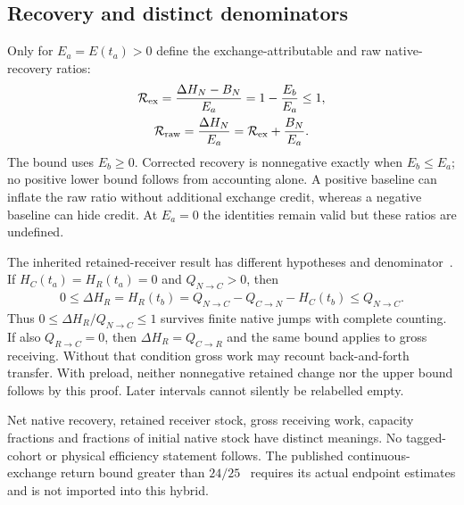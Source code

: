 \subsection{Recovery and distinct denominators}\label{sec:recovery}
Only for $E_a=E(t_a)>0$ define the exchange-attributable and raw native-recovery ratios:
\begin{equation}\label{eq:a16}%
\begin{gathered}
\mathcal R_{\rm ex}=\frac{\Delta H_N-B_N}{E_a}
=1-\frac{E_b}{E_a}\le1,\\ \mathcal R_{\rm raw}=\frac{\Delta H_N}{E_a}
=\mathcal R_{\rm ex}+\frac{B_N}{E_a}.
\end{gathered}
\end{equation}
The bound uses $E_b\ge0$. Corrected recovery is nonnegative exactly when $E_b\le E_a$; no positive lower bound follows from accounting alone. A positive baseline can inflate the raw ratio without additional exchange credit, whereas a negative baseline can hide credit. At $E_a=0$ the identities remain valid but these ratios are undefined.

The inherited retained-receiver result has different hypotheses and denominator~\cite[Proposition 7.1]{rx}. If $H_C(t_a)=H_R(t_a)=0$ and $Q_{N\to C}>0$, then
\begin{equation}\label{eq:a17}%
\begin{gathered}
0\le\Delta H_R=H_R(t_b)=Q_{N\to C}-Q_{C\to N}-H_C(t_b)
\le Q_{N\to C}.
\end{gathered}
\end{equation}
Thus $0\le\Delta H_R/Q_{N\to C}\le1$ survives finite native jumps with complete counting. If also $Q_{R\to C}=0$, then $\Delta H_R=Q_{C\to R}$ and the same bound applies to gross receiving. Without that condition gross work may recount back-and-forth transfer. With preload, neither nonnegative retained change nor the upper bound follows by this proof. Later intervals cannot silently be relabelled empty.

Net native recovery, retained receiver stock, gross receiving work, capacity fractions and fractions of initial native stock have distinct meanings. No tagged-cohort or physical efficiency statement follows. The published continuous-exchange return bound greater than $24/25$~\cite[Theorem 3.1]{rr} requires its actual endpoint estimates and is not imported into this hybrid.

